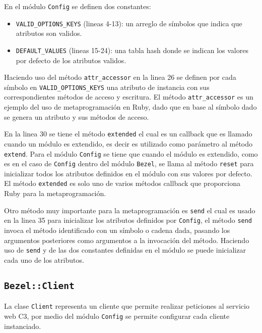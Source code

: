 En el módulo \texttt{Config} se definen dos constantes:

\begin{itemize}
\item \texttt{VALID\_OPTIONS\_KEYS} (lineas 4-13): un arreglo de símbolos que indica
  que atributos son validos.
\item \texttt{DEFAULT\_VALUES} (lineas 15-24): una tabla hash donde se indican los
  valores por defecto de los atributos validos.
\end{itemize}

Haciendo uso del método \texttt{attr\_accessor} en la linea 26 se definen por cada
símbolo en \texttt{VALID\_OPTIONS\_KEYS} una atributo de instancia con sus
correspondientes métodos de acceso y escritura. El método \texttt{attr\_accessor} es
un ejemplo del uso de metaprogramación en Ruby, dado que en base al símbolo dado se
genera un atributo y sus métodos de acceso.


En la linea 30 se tiene el método \texttt{extended} el cual es un callback que es
llamado cuando un módulo es extendido, es decir es utilizado como parámetro al
método \texttt{extend}. Para el módulo \texttt{Config} se tiene que cuando el módulo
es extendido, como es en el caso de \texttt{Config} dentro del módulo \texttt{Bezel},
se llama al método \texttt{reset} para inicializar todos los atributos definidos en
el módulo con sus valores por defecto. El método \texttt{extended} es solo uno
de varios métodos callback que proporciona Ruby para la metaprogramación.

Otro método muy importante para la metaprogramación es \texttt{send} el cual es usado
en la linea 35 para inicializar los atributos definidos por \texttt{Config}, el
método \texttt{send} invoca el método identificado con un símbolo o cadena dada,
pasando los argumentos posteriores como argumentos a la invocación del método.
Haciendo uso de \texttt{send} y de las dos constantes definidas en el módulo
se puede inicializar cada uno de los atributos.

\subsection{\texttt{Bezel::Client}}

La clase \texttt{Client} representa un cliente que permite realizar peticiones al
servicio web C3, por medio del módulo \texttt{Config} se permite configurar
cada cliente instanciado.

